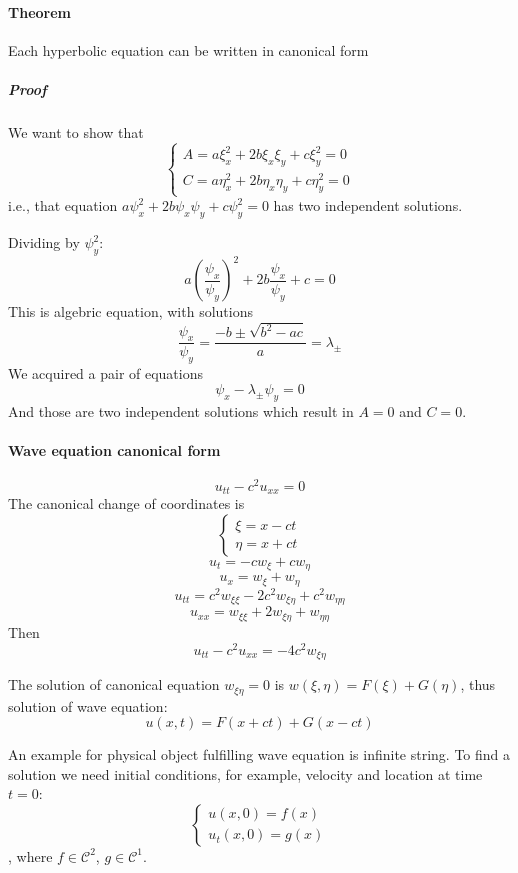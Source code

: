 \paragraph{Theorem} Each hyperbolic equation can be written in canonical form
\subparagraph{Proof}
We want to show that 
$$\begin{cases}
A = a\xi_x^2 + 2b\xi_x\xi_y + c\xi_y^2 = 0\\
C =a\eta_x^2 + 2b\eta_x\eta_y + c\eta_y^2 = 0
\end{cases}$$
i.e., that equation $a\psi_x^2 + 2b\psi_x\psi_y + c\psi_y^2 = 0$ has two independent solutions.

Dividing by $\psi_y^2$:
$$a\left(\frac{\psi_x}{\psi_y}\right)^2 + 2b\frac{\psi_x}{\psi_y} + c = 0$$
This is algebric equation, with solutions
$$\frac{\psi_x}{\psi_y} = \frac{-b\pm \sqrt{b^2-ac}}{a} = \lambda_\pm$$
We acquired a pair of equations
$$\psi_x - \lambda_\pm \psi_y = 0$$
And those are two independent solutions which result in $A=0$ and $C=0$.

\paragraph{Wave equation canonical form}
$$
u_{tt} - c^2 u_{xx} = 0$$
The canonical change of coordinates is
$$\begin{cases}
\xi = x-ct\\
\eta = x+ct
\end{cases}$$
$$u_{t} = -cw_\xi + cw_\eta$$
$$u_{x} = w_\xi + w_\eta$$
$$u_{tt} = c^2 w_{\xi\xi} - 2c^2w_{\xi\eta} +  c^2w_{\eta\eta}$$
$$u_{xx} = w_{\xi\xi} + 2w_{\xi\eta} + w_{\eta\eta}$$
Then
$$u_{tt} - c^2u_{xx} = -4c^2w_{\xi\eta}$$

The solution of canonical equation $w_{\xi \eta} = 0$ is $w(\xi, \eta) = F(\xi) + G(\eta)$, thus solution of wave equation:
$$u(x,t) = F(x+ct) + G(x-ct)$$

An example for physical object fulfilling wave equation is infinite string. To find a solution we need initial conditions, for example, velocity and location at time $t=0$:
$$\begin{cases}
u(x,0) = f(x)\\u_t(x,0) = g(x)
\end{cases}$$
, where $f\in \mathcal{C}^2$, $g\in \mathcal{C}^1$.
